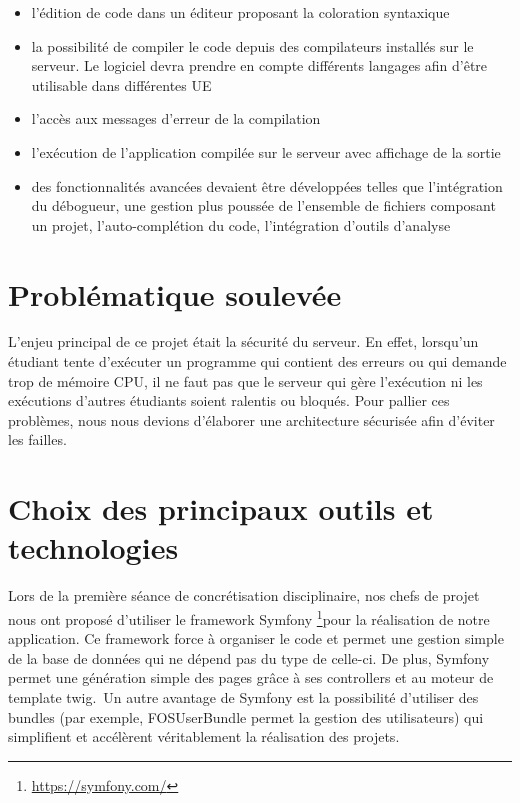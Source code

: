 \begin{itemize}

	\item l'édition de code dans un éditeur proposant la coloration syntaxique
	\item la possibilité de compiler le code depuis des compilateurs installés sur le serveur. Le logiciel devra prendre en compte différents langages afin d’être utilisable dans différentes UE
	\item l'accès aux messages d'erreur de la compilation
	\item l'exécution de l'application compilée sur le serveur avec affichage de la sortie
	\item des fonctionnalités avancées devaient être développées telles que l’intégration du débogueur, une gestion plus poussée de l’ensemble de fichiers composant un projet, l'auto-complétion du code, l'intégration d’outils d’analyse

\end{itemize}


\section{Problématique soulevée}

\par L'enjeu principal de ce projet était la sécurité du serveur. En effet, lorsqu'un étudiant tente d'exécuter un programme qui contient des erreurs ou qui demande trop de mémoire CPU, il ne faut pas que le serveur qui gère l'exécution ni les exécutions d'autres étudiants soient ralentis ou bloqués. Pour pallier ces problèmes, nous nous devions d'élaborer une architecture sécurisée afin d'éviter les failles.


\section{Choix des principaux outils et technologies}
\label{sec-principaux-outils}
\par Lors de la première séance de concrétisation disciplinaire, nos chefs de projet nous ont proposé d'utiliser le framework Symfony \footnote{\url{https://symfony.com/}}pour la réalisation de notre application. Ce framework force à organiser le code et permet une gestion simple de la base de données qui ne dépend pas du type de celle-ci. De plus, Symfony permet une génération simple des pages grâce à ses controllers et au moteur de template twig.\
Un autre avantage de Symfony est la possibilité d'utiliser des bundles (par exemple, FOSUserBundle permet la gestion des utilisateurs) qui simplifient et accélèrent véritablement la réalisation des projets. \\

